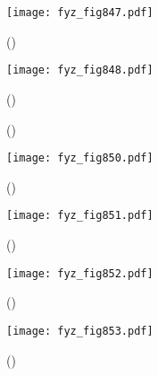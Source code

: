     \begin{figure}[ht!] %
      \centering
      \texttt{[image: fyz\_fig847.pdf]}
      \caption{
               (\cite[s.~707]{Feynman02})}
      \label{fyz:fig847}
    \end{figure}

    \begin{figure}[ht!] %
      \centering
      \texttt{[image: fyz\_fig848.pdf]}
      \caption{
               (\cite[s.~707]{Feynman02})}
      \label{fyz:fig848}
    \end{figure}

    \begin{figure}[ht!] %
      \centering
                     \newline
      \caption{
               (\cite[s.~748]{Feynman02})}
      \label{fyz:fig849}
    \end{figure}

    \begin{figure}[ht!] %
      \centering
      \texttt{[image: fyz\_fig850.pdf]}
      \caption{
               (\cite[s.~707]{Feynman02})}
      \label{fyz:fig850}
    \end{figure}

    \begin{figure}[ht!] %
      \centering
      \texttt{[image: fyz\_fig851.pdf]}
      \caption{
               (\cite[s.~707]{Feynman02})}
      \label{fyz:fig851}
    \end{figure}

    \begin{figure}[ht!] %
      \centering
      \texttt{[image: fyz\_fig852.pdf]}
      \caption{
               (\cite[s.~707]{Feynman02})}
      \label{fyz:fig852}
    \end{figure}

    \begin{figure}[ht!] %
      \centering
      \texttt{[image: fyz\_fig853.pdf]}
      \caption{
               (\cite[s.~707]{Feynman02})}
      \label{fyz:fig853}
    \end{figure}

    
